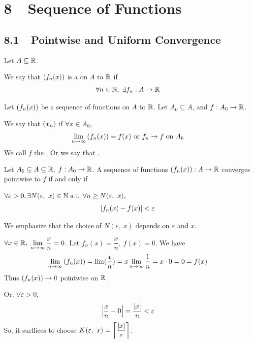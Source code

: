 \documentclass[a4paper,12pt]{article}
\begin{document}
\newpage

\section*{8\ \ Sequence of Functions}
\subsection*{8.1\ \ Pointwise and Uniform Convergence}
\begin{definition}
    Let \(A\subseteq\R\). 
    
    We say that \(\seqfun{x}\) is a  on \(A\) to \(\R\) if 
    \[\forall n\in\N,\ \exists f_n:A\rightarrow\R\]
\end{definition}

\begin{definition}
    Let \(\seqfun[n ]{x}\) be a sequence of functions on \(A\) to \(\R\). Let \(A_0\subseteq A\), and \(f:A_0\rightarrow\R\). 
    
    We say that \(\seq{x}{n}\)  if \(\forall x\in A_0\), 
    \[\limn{\seqfun{x}}=f(x)\text{ or }f_n\rightarrow f\text{ on }A_0\]
    We call \(f\) the . Or we say that .\\
\end{definition}

\begin{lemma}
    Let \(A_0\subseteq A\subseteq\R\), \(f:A_0\rightarrow\R\). 
    A sequence of functions \(\seqfun[n ]{x }:A\rightarrow\R\) converges pointwise to \(f\) if and only if 

    \(\forall \varepsilon>0, \exists N(\varepsilon,\ x)\in\N\st \forall n\ge N(\varepsilon,\ x),\)
    \[\abs{f_n(x)-f(x)}<\varepsilon\]
    \begin{remark}
        We emphasize that the choice of \(N(\varepsilon,\ x)\) depends on  \(\varepsilon\) and \(x\).\\
    \end{remark}
\end{lemma}

\begin{example}\(\ds \forall x\in\R,\ \limn{\frac{x }{n }}=0\). Let \(f_n(x)=\dfrac{x }{n },\ f(x)=0\). We have 
    \[\limn{\seqfun[n ]{x }}=\lim(\frac{x }{n })=x\limn{\frac{1 }{n }}=x\cdot 0=0=f(x)\]
    Thus \(\seqfun[n ]{x }\rightarrow 0\) pointwise on \(\R\). 

    Or, \(\forall \varepsilon>0, \)
    \[\abs{\frac{x }{n }-0}=\frac{\abs{x }}{n}<\varepsilon\]
    So, it surffices to choose \(K(\varepsilon,\ x)=\ds\left\lceil\frac{\abs{x}}{\varepsilon}\right\rceil\).
\end{example}
\end{document}
